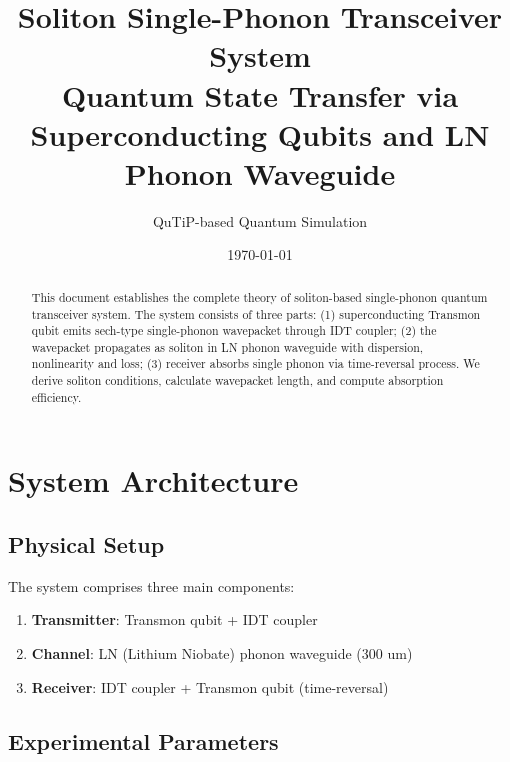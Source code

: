 \documentclass[12pt,a4paper]{article}
\title{\textbf{Soliton Single-Phonon Transceiver System}\\[0.5em]
\large Quantum State Transfer via Superconducting Qubits and LN Phonon Waveguide}
\author{QuTiP-based Quantum Simulation}
\date{\today}
\theoremstyle{definition}
\begin{document}
\maketitle

\begin{abstract}
This document establishes the complete theory of soliton-based single-phonon quantum transceiver system. The system consists of three parts: (1) superconducting Transmon qubit emits sech-type single-phonon wavepacket through IDT coupler; (2) the wavepacket propagates as soliton in LN phonon waveguide with dispersion, nonlinearity and loss; (3) receiver absorbs single phonon via time-reversal process. We derive soliton conditions, calculate wavepacket length, and compute absorption efficiency.
\end{abstract}

\tableofcontents
\newpage

\section{System Architecture}

\subsection{Physical Setup}

The system comprises three main components:
\begin{enumerate}
\item \textbf{Transmitter}: Transmon qubit + IDT coupler
\item \textbf{Channel}: LN (Lithium Niobate) phonon waveguide (300 um)
\item \textbf{Receiver}: IDT coupler + Transmon qubit (time-reversal)
\end{enumerate}

\subsection{Experimental Parameters}
\end{document}
